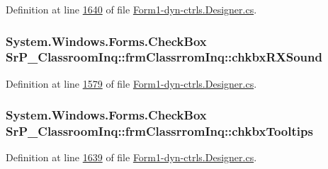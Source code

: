 \-Definition at line \hyperlink{_form1-dyn-ctrls_8_designer_8cs_source_l01640}{1640} of file \hyperlink{_form1-dyn-ctrls_8_designer_8cs_source}{\-Form1-\/dyn-\/ctrls.\-Designer.\-cs}.

\hypertarget{class_sr_p___classroom_inq_1_1frm_classrrom_inq_af7626aaecde3bb58d5cfee3957410aa8}{
\subsubsection[{chkbx\-R\-X\-Sound}]{\setlength{\rightskip}{0pt plus 5cm}\-System.\-Windows.\-Forms.\-Check\-Box {\bf \-Sr\-P\-\_\-\-Classroom\-Inq\-::frm\-Classrrom\-Inq\-::chkbx\-R\-X\-Sound}}}
\label{class_sr_p___classroom_inq_1_1frm_classrrom_inq_af7626aaecde3bb58d5cfee3957410aa8}


\-Definition at line \hyperlink{_form1-dyn-ctrls_8_designer_8cs_source_l01579}{1579} of file \hyperlink{_form1-dyn-ctrls_8_designer_8cs_source}{\-Form1-\/dyn-\/ctrls.\-Designer.\-cs}.

\hypertarget{class_sr_p___classroom_inq_1_1frm_classrrom_inq_a1952935fe5b823dcc597f5aafd7436aa}{
\subsubsection[{chkbx\-Tooltips}]{\setlength{\rightskip}{0pt plus 5cm}\-System.\-Windows.\-Forms.\-Check\-Box {\bf \-Sr\-P\-\_\-\-Classroom\-Inq\-::frm\-Classrrom\-Inq\-::chkbx\-Tooltips}}}
\label{class_sr_p___classroom_inq_1_1frm_classrrom_inq_a1952935fe5b823dcc597f5aafd7436aa}


\-Definition at line \hyperlink{_form1-dyn-ctrls_8_designer_8cs_source_l01639}{1639} of file \hyperlink{_form1-dyn-ctrls_8_designer_8cs_source}{\-Form1-\/dyn-\/ctrls.\-Designer.\-cs}.

